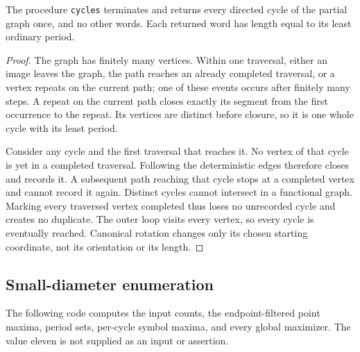 \begin{lemma}
\label{lem:extraction}
The procedure \texttt{cycles} terminates and returns every directed
cycle of the partial graph once, and no other words. Each returned
word has length equal to its least ordinary period.
\end{lemma}
\begin{proof}
The graph has finitely many vertices. Within one traversal, either
an image leaves the graph, the path reaches an already completed
traversal, or a vertex repeats on the current path; one of these
events occurs after finitely many steps. A repeat on the current
path closes exactly its segment from the first occurrence to the
repeat. Its vertices are distinct before closure, so it is one
whole cycle with its least period.

Consider any cycle and the first traversal that reaches it.
No vertex of that cycle is yet in a completed traversal.
Following the deterministic edges therefore closes and records it.
A subsequent path reaching that cycle stops at a completed vertex
and cannot record it again. Distinct cycles cannot intersect in a
functional graph. Marking every traversed vertex completed thus
loses no unrecorded cycle and creates no duplicate. The outer loop
visits every vertex, so every cycle is eventually reached.
Canonical rotation changes only its chosen starting coordinate,
not its orientation or its length.
\end{proof}

\subsection{Small-diameter enumeration}

The following code computes the input counts, the endpoint-filtered
point maxima, period sets, per-cycle symbol maxima, and every global
maximizer. The value eleven is not supplied as an input or assertion.

